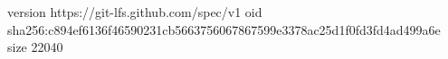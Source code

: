 version https://git-lfs.github.com/spec/v1
oid sha256:c894ef6136f46590231cb5663756067867599e3378ac25d1f0fd3fd4ad499a6e
size 22040
